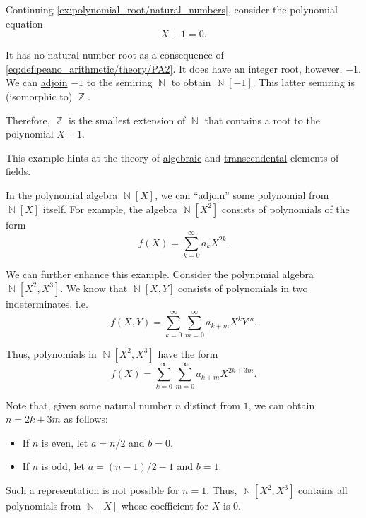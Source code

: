 \begin{example}\label{ex:adjoining_root}
  Continuing \cref{ex:polynomial_root/natural_numbers}, consider the polynomial equation
  \begin{equation*}
    X + 1 = 0.
  \end{equation*}

  It has no natural number root as a consequence of \eqref{eq:def:peano_arithmetic/theory/PA2}. It does have an integer root, however, \( -1 \). We can \hyperref[def:semiring_adjunction]{adjoin} \( -1 \) to the semiring \( \BbbN \) to obtain \( \BbbN[-1] \). This latter semiring is (isomorphic to) \( \BbbZ \).

  Therefore, \( \BbbZ \) is the smallest extension of \( \BbbN \) that contains a root to the polynomial \( X + 1 \).

  This example hints at the theory of \hyperref[def:algebraic_element]{algebraic} and \hyperref[def:transcendental_element]{transcendental} elements of fields.
\end{example}

\begin{example}\label{ex:adjoining_polynomial}
  In the polynomial algebra \( \BbbN[X] \), we can \enquote{adjoin} some polynomial from \( \BbbN[X] \) itself. For example, the algebra \( \BbbN[X^2] \) consists of polynomials of the form
  \begin{equation*}
    f(X) = \sum_{k=0}^\infty a_k X^{2k}.
  \end{equation*}

  We can further enhance this example. Consider the polynomial algebra \( \BbbN[X^2, X^3] \). We know that \( \BbbN[X, Y] \) consists of polynomials in two indeterminates, i.e.
  \begin{equation*}
    f(X, Y) = \sum_{k=0}^\infty \sum_{m=0}^\infty a_{k+m} X^k Y^m.
  \end{equation*}

  Thus, polynomials in \( \BbbN[X^2, X^3] \) have the form
  \begin{equation*}
    f(X) = \sum_{k=0}^\infty \sum_{m=0}^\infty a_{k+m} X^{2k + 3m}.
  \end{equation*}

  Note that, given some natural number \( n \) distinct from \( 1 \), we can obtain \( n = 2k + 3m \) as follows:
  \begin{itemize}
    \item If \( n \) is even, let \( a = n / 2 \) and \( b = 0 \).
    \item If \( n \) is odd, let \( a = (n - 1) / 2 - 1 \) and \( b = 1 \).
  \end{itemize}

  Such a representation is not possible for \( n = 1 \). Thus, \( \BbbN[X^2, X^3] \) contains all polynomials from \( \BbbN[X] \) whose coefficient for \( X \) is \( 0 \).
\end{example}

